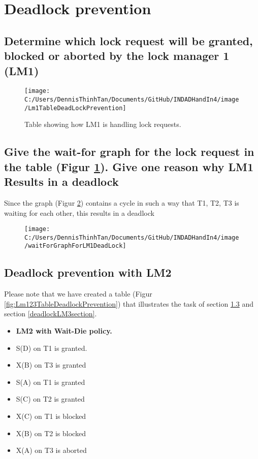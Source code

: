 \section{Deadlock prevention}
\subsection{Determine which lock request will be granted, blocked or aborted by the lock manager 1 (LM1)}\label{deadlockLM1section}

\begin{figure}[H]
\centering
\texttt{[image: C:/Users/DennisThinhTan/Documents/GitHub/INDADHandIn4/image/Lm1TableDeadLockPrevention]}
\caption[Table showing how LM1 is handling locks]{Table showing how LM1 is handling lock requests.}
\label{fig:Lm1TableDeadlock}
\end{figure}
\pagebreak
\subsection{Give the wait-for graph for the lock request in the table (Figur \ref{fig:Lm1TableDeadlock}). Give one reason why LM1 Results in a deadlock }

Since the graph (Figur \ref{fig:waitForGraphForLM1DeadLock}) contains a cycle in such a way that T1, T2, T3 is waiting for each other, this results in a deadlock

\begin{figure} [H]
\centering
\texttt{[image: C:/Users/DennisThinhTan/Documents/GitHub/INDADHandIn4/image/waitForGraphForLM1DeadLock]}
\caption[Wait-for graph of LM1 depicting a deadlock.]{}
\caption{}
\label{fig:waitForGraphForLM1DeadLock}
\end{figure}

	
\pagebreak
\subsection{Deadlock prevention with LM2} \label{deadlockLM2section}
Please note that we have created a table (Figur \ref{fig:Lm123TableDeadlockPrevention}) that illustrates the task of section \ref{deadlockLM2section} and section \ref{deadlockLM3section}.
\begin{itemize}
	\item{\textbf{LM2 with Wait-Die policy.}}
	\item S(D) on T1 is granted.
	\item X(B) on T3 is granted
	\item S(A) on T1 is granted
	\item S(C) on T2 is granted
	\item X(C) on T1 is blocked
	\item X(B) on T2 is blocked
	\item X(A) on T3 is aborted
\end{itemize}

